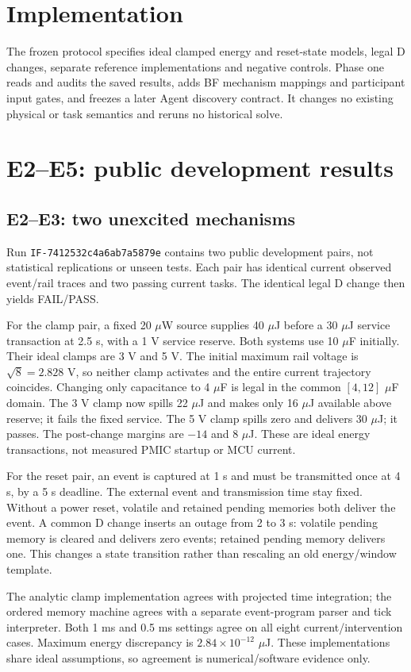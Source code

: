 \documentclass[10pt]{article}
\begin{document}
\section{Implementation}
The frozen protocol specifies ideal clamped energy and reset-state models, legal D changes, separate reference implementations and negative controls. Phase one reads and audits the saved results, adds BF mechanism mappings and participant input gates, and freezes a later Agent discovery contract. It changes no existing physical or task semantics and reruns no historical solve.
\section{E2--E5: public development results}
\subsection{E2--E3: two unexcited mechanisms}
Run \texttt{IF-7412532c4a6ab7a5879e} contains two public development pairs, not statistical replications or unseen tests. Each pair has identical current observed event/rail traces and two passing current tasks. The identical legal D change then yields FAIL/PASS.

For the clamp pair, a fixed 20 $\mu$W source supplies 40 $\mu$J before a 30 $\mu$J service transaction at 2.5 s, with a 1 V service reserve. Both systems use 10 $\mu$F initially. Their ideal clamps are 3 V and 5 V. The initial maximum rail voltage is $\sqrt{8}=2.828$ V, so neither clamp activates and the entire current trajectory coincides. Changing only capacitance to 4 $\mu$F is legal in the common $[4,12]$ $\mu$F domain. The 3 V clamp now spills 22 $\mu$J and makes only 16 $\mu$J available above reserve; it fails the fixed service. The 5 V clamp spills zero and delivers 30 $\mu$J; it passes. The post-change margins are $-14$ and $8$ $\mu$J. These are ideal energy transactions, not measured PMIC startup or MCU current.

For the reset pair, an event is captured at 1 s and must be transmitted once at 4 s, by a 5 s deadline. The external event and transmission time stay fixed. Without a power reset, volatile and retained pending memories both deliver the event. A common D change inserts an outage from 2 to 3 s: volatile pending memory is cleared and delivers zero events; retained pending memory delivers one. This changes a state transition rather than rescaling an old energy/window template.

The analytic clamp implementation agrees with projected time integration; the ordered memory machine agrees with a separate event-program parser and tick interpreter. Both 1 ms and 0.5 ms settings agree on all eight current/intervention cases. Maximum energy discrepancy is $2.84\times 10^{-12}$ $\mu$J. These implementations share ideal assumptions, so agreement is numerical/software evidence only.
\end{document}
